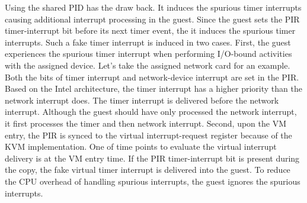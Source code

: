 Using the shared PID has the draw back. It induces the
spurious timer interrupts causing additional interrupt
processing in the guest. Since the guest sets the PIR
timer-interrupt bit before its next timer event, the it
induces the spurious timer interrupts. Such a fake timer
interrupt is induced in two cases. First, the guest
experiences the spurious timer interrupt when performing
I/O-bound activities with the assigned device. Let's take the
assigned network card for an example. Both the bits of timer
interrupt and network-device interrupt are set in the PIR.
Based on the Intel architecture, the timer interrupt has a
higher priority than the network interrupt does. The timer
interrupt is delivered before the network interrupt. Although
the guest should have only processed the network interrupt, it
first processes the timer and then network interrupt. Second,
upon the VM entry, the PIR is synced to the virtual
interrupt-request register because of the KVM implementation.
One of time points to evaluate the virtual interrupt delivery
is at the VM entry time. If the PIR timer-interrupt bit is
present during the copy, the fake virtual timer interrupt is
delivered into the guest. To reduce the CPU overhead of
handling spurious interrupts, the guest ignores the spurious
interrupts.

